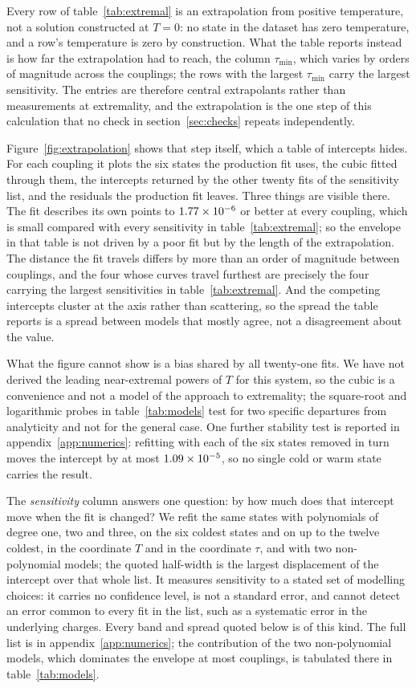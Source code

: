 \documentclass[11pt,a4paper]{article}
\begin{document}
Every row of table~\ref{tab:extremal} is an extrapolation from positive
temperature, not a solution constructed at $T=0$: no state in the dataset has
zero temperature, and a row's temperature is zero by construction. What the
table reports instead is how far the extrapolation had to reach, the column
$\tau_{\min}$, which varies by orders of magnitude across the couplings; the
rows with the largest $\tau_{\min}$ carry the largest sensitivity. The entries
are therefore central extrapolants rather than measurements at extremality, and
the extrapolation is the one step of this calculation that no check in
section~\ref{sec:checks} repeats independently.

Figure~\ref{fig:extrapolation} shows that step itself, which a table of
intercepts hides. For each coupling it plots the six states the production fit
uses, the cubic fitted through them, the intercepts returned by the other
twenty fits of the sensitivity list, and the residuals the production fit
leaves. Three things are visible there. The fit describes its own points to
$1.77\times 10^{-6}$ or better at every coupling, which is small compared with
every sensitivity in table~\ref{tab:extremal}; so the envelope in that table is
not driven by a poor fit but by the length of the extrapolation. The
distance the fit travels differs by more than an order of magnitude between
couplings, and the four whose curves travel furthest are precisely the four
carrying the largest sensitivities in table~\ref{tab:extremal}. And the competing intercepts cluster at the axis rather
than scattering, so the spread the table reports is a spread between models
that mostly agree, not a disagreement about the value.

What the figure cannot show is a bias shared by all twenty-one fits. We have
not derived the leading near-extremal powers of $T$ for this system, so the
cubic is a convenience and not a model of the approach to extremality; the
square-root and logarithmic probes in table~\ref{tab:models} test for two
specific departures from analyticity and not for the general case. One further
stability test is reported in appendix~\ref{app:numerics}: refitting with each
of the six states removed in turn moves the intercept by at most
$1.09\times 10^{-5}$, so no single cold or warm state carries the result.

The \emph{sensitivity} column answers one question: by how much does that
intercept move when the fit is changed? We refit the same states with
polynomials of degree one, two and three, on the six coldest states and on up
to the twelve coldest, in the coordinate $T$ and in the coordinate $\tau$, and
with two non-polynomial models; the quoted half-width is the largest
displacement of the intercept over that whole list. It measures sensitivity to
a stated set of modelling choices: it carries no confidence level, is not a
standard error, and cannot detect an error common to every fit in the list,
such as a systematic error in the underlying charges. Every band and spread
quoted below is of this kind. The full list is in
appendix~\ref{app:numerics}; the contribution of the two non-polynomial
models, which dominates the envelope at most couplings, is tabulated there in
table~\ref{tab:models}.
\end{document}
